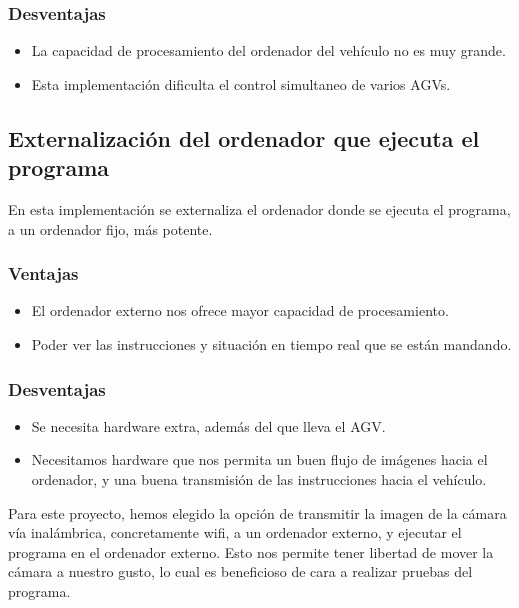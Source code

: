 \subsubsection{Desventajas} 
\begin{itemize}

	\item La capacidad de procesamiento del ordenador del vehículo no es muy grande.
	
	\item Esta implementación dificulta el control simultaneo de varios AGVs.
	
\end{itemize}

\subsection{Externalización del ordenador que ejecuta el programa} 


En esta implementación se externaliza el ordenador donde se ejecuta el programa, a un ordenador fijo, más potente.
\subsubsection{Ventajas}
\begin{itemize}
	\item El ordenador externo nos ofrece mayor capacidad de procesamiento.
	
	\item Poder ver las instrucciones y situación en tiempo real que se están mandando.
	
\end{itemize}

\subsubsection{Desventajas}
\begin{itemize}
	\item Se necesita hardware extra, además del que lleva el AGV.
	
	\item Necesitamos hardware que nos permita un buen flujo de imágenes hacia el ordenador, y una buena transmisión de las instrucciones hacia el vehículo.
	
\end{itemize} 

Para este proyecto, hemos elegido la opción de transmitir la imagen de la cámara vía inalámbrica, concretamente wifi, a un ordenador externo, y ejecutar el programa en el ordenador externo. Esto nos permite tener libertad de mover la cámara a nuestro gusto, lo cual es beneficioso de cara a realizar pruebas del programa.

